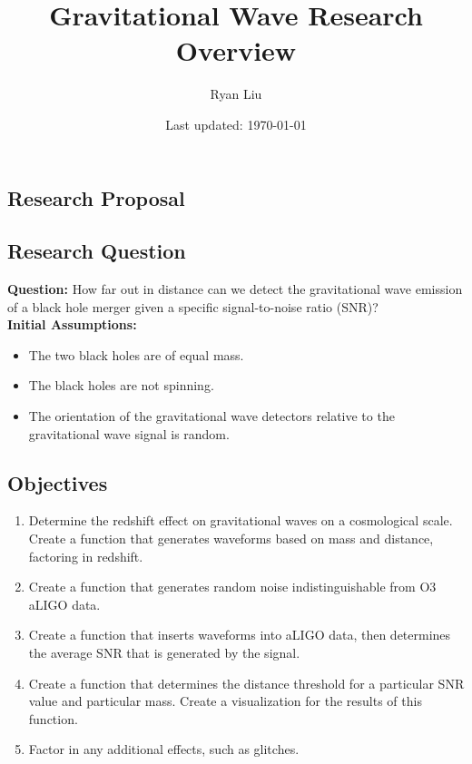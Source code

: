 \documentclass{article}
\title{Gravitational Wave Research Overview}
\author{Ryan Liu}
\date{Last updated: \today}
\begin{document}
\maketitle

\begin{multicols*}{2}

\section{Research Proposal}

\subsection{Research Question}

\textbf{Question:} How far out in distance can we detect the gravitational wave emission of a black hole merger given a specific signal-to-noise ratio (SNR)? \\

\textbf{Initial Assumptions:}
\begin{itemize}
    \setlength\itemsep{0pt}
    \item The two black holes are of equal mass.
    \item The black holes are not spinning.
    \item The orientation of the gravitational wave detectors relative to the gravitational wave signal is random. 
\end{itemize}

\subsection{Objectives}

\begin{enumerate}
    \item Determine the redshift effect on gravitational waves on a cosmological scale. Create a function that generates waveforms based on mass and distance, factoring in redshift. 
    \item Create a function that generates random noise indistinguishable from O3 aLIGO data. 
    \item Create a function that inserts waveforms into aLIGO data, then determines the average SNR that is generated by the signal. 
    \item Create a function that determines the distance threshold for a particular SNR value and particular mass. Create a visualization for the results of this function. 
    \item Factor in any additional effects, such as glitches. 
\end{enumerate}


\end{multicols*}
\end{document}
